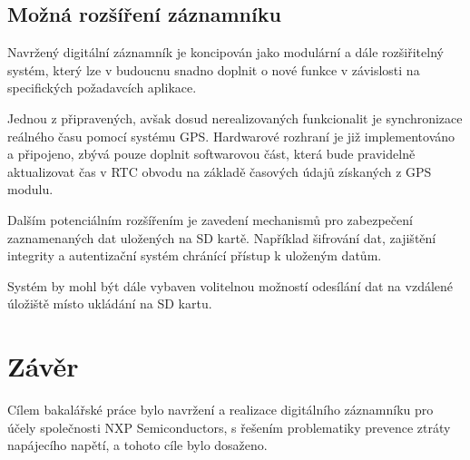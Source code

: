 

\section{Možná rozšíření záznamníku}
\label{mozne_rozsireni}
Navržený digitální záznamník je koncipován jako modulární a dále rozšiřitelný systém, který lze v budoucnu snadno doplnit o nové funkce v závislosti na specifických požadavcích aplikace.

Jednou z připravených, avšak dosud nerealizovaných funkcionalit je synchronizace reálného času pomocí systému GPS. Hardwarové rozhraní je již implementováno a připojeno, zbývá pouze doplnit softwarovou část, která bude pravidelně aktualizovat čas v RTC obvodu na základě časových údajů získaných z GPS modulu.

Dalším potenciálním rozšířením je zavedení mechanismů pro zabezpečení zaznamenaných dat uložených na SD kartě. Například šifrování dat, zajištění integrity a autentizační systém chránící přístup k uloženým datům.

Systém by mohl být dále vybaven volitelnou možností odesílání dat na vzdálené úložiště místo ukládání na SD kartu.



\chapter{Závěr}
\label{zaver}
Cílem bakalářské práce bylo navržení a realizace digitálního záznamníku pro účely společnosti NXP Semiconductors, s řešením problematiky prevence ztráty napájecího napětí, a tohoto cíle bylo dosaženo.

